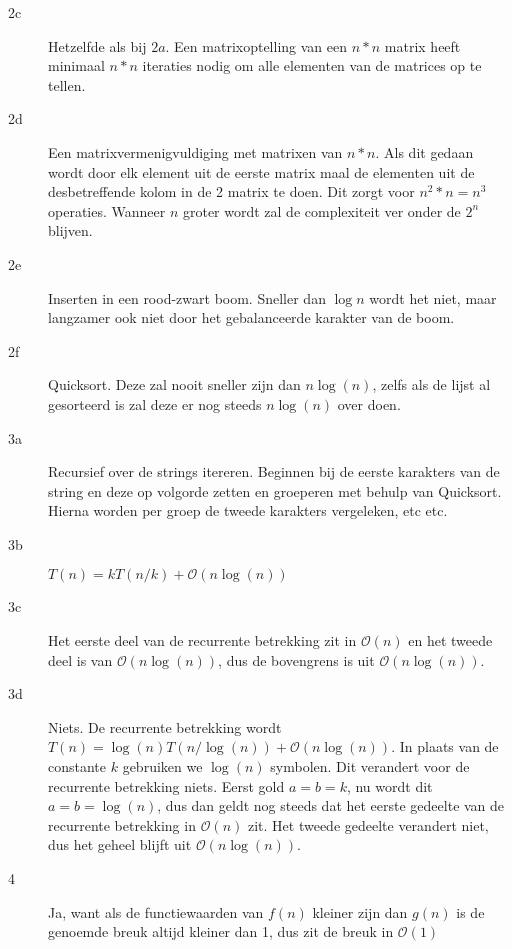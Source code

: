 \documentclass[11pt]{article}
\newcommand{\bigO}{\ensuremath{\mathcal{O}}}
\begin{document}
\begin{description}
    \item[2c] Hetzelfde als bij $2a$. Een matrixoptelling van een $n*n$ matrix
        heeft minimaal $n*n$ iteraties nodig om alle elementen van de matrices
        op te tellen.

    \item[2d] Een matrixvermenigvuldiging met matrixen van $n*n$. Als dit gedaan
        wordt door elk element uit de eerste matrix maal de elementen uit de
        desbetreffende kolom in de 2 matrix te doen. Dit zorgt voor $n^2*n = n^3$
        operaties. Wanneer $n$ groter wordt zal de complexiteit ver onder de
        $2^n$ blijven.

    \item[2e] Inserten in een rood-zwart boom. Sneller dan $\log n$ wordt het
        niet, maar langzamer ook niet door het gebalanceerde karakter van de
        boom.

    \item[2f] Quicksort. Deze zal nooit sneller zijn dan $n\log(n)$, zelfs als
        de lijst al gesorteerd is zal deze er nog steeds $n\log(n)$ over doen.
        \\


    \item[3a] Recursief over de strings itereren. Beginnen bij de eerste
        karakters van de string en deze op volgorde zetten en groeperen met
        behulp van Quicksort. Hierna worden per groep de tweede karakters
        vergeleken, etc etc.

    \item[3b] $T(n) = kT(n/k) + \bigO(n\log(n))$

    \item[3c] Het eerste deel van de recurrente betrekking zit in $\bigO(n)$ en
        het tweede deel is van $\bigO(n\log(n))$, dus de bovengrens is uit
        $\bigO(n\log(n))$.

    \item[3d] Niets. De recurrente betrekking wordt $T(n) = \log(n)T(n/\log(n))
        + \bigO(n\log(n))$. In plaats van de constante $k$ gebruiken we
        $\log(n)$ symbolen. Dit verandert voor de recurrente betrekking niets.
        Eerst gold $a = b = k$, nu wordt dit $a = b = \log(n)$, dus dan geldt
        nog steeds dat het eerste gedeelte van de recurrente betrekking in
        $\bigO(n)$ zit. Het tweede gedeelte verandert niet, dus het geheel
        blijft uit $\bigO(n\log(n))$.
        \\


    \item[4] Ja, want als de functiewaarden van $f(n)$ kleiner zijn dan $g(n)$
        is de genoemde breuk altijd kleiner dan 1, dus zit de breuk in
        \bigO$(1)$


\end{description}
\end{document}
